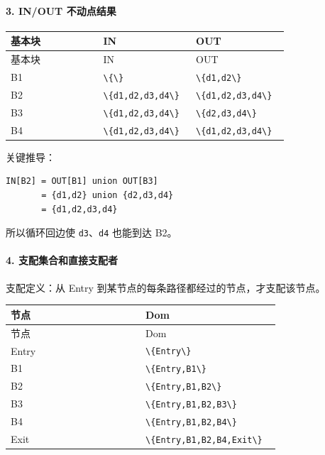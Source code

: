 \documentclass[UTF8]{ctexart}
\begin{document}
\paragraph*{3. IN/OUT 不动点结果}

\begin{longtable}{|p{0.31\linewidth}|p{0.31\linewidth}|p{0.31\linewidth}|}
\hline
基本块 & IN & OUT \\
\hline
\endfirsthead
基本块 & IN & OUT \\
\hline
\endhead
B1 & \texttt{\textbackslash{}\{\textbackslash{}\}} & \texttt{\textbackslash{}\{d1,d2\textbackslash{}\}} \\
\hline
B2 & \texttt{\textbackslash{}\{d1,d2,d3,d4\textbackslash{}\}} & \texttt{\textbackslash{}\{d1,d2,d3,d4\textbackslash{}\}} \\
\hline
B3 & \texttt{\textbackslash{}\{d1,d2,d3,d4\textbackslash{}\}} & \texttt{\textbackslash{}\{d2,d3,d4\textbackslash{}\}} \\
\hline
B4 & \texttt{\textbackslash{}\{d1,d2,d3,d4\textbackslash{}\}} & \texttt{\textbackslash{}\{d1,d2,d3,d4\textbackslash{}\}} \\
\hline
\end{longtable}

关键推导：

\begin{Verbatim}[fontsize=\small,breaklines=true]
IN[B2] = OUT[B1] union OUT[B3]
       = {d1,d2} union {d2,d3,d4}
       = {d1,d2,d3,d4}
\end{Verbatim}

所以循环回边使 \texttt{d3}、\texttt{d4} 也能到达 B2。

\paragraph*{4. 支配集合和直接支配者}

支配定义：从 Entry 到某节点的每条路径都经过的节点，才支配该节点。

\begin{longtable}{|p{0.47\linewidth}|p{0.47\linewidth}|}
\hline
节点 & Dom \\
\hline
\endfirsthead
节点 & Dom \\
\hline
\endhead
Entry & \texttt{\textbackslash{}\{Entry\textbackslash{}\}} \\
\hline
B1 & \texttt{\textbackslash{}\{Entry,B1\textbackslash{}\}} \\
\hline
B2 & \texttt{\textbackslash{}\{Entry,B1,B2\textbackslash{}\}} \\
\hline
B3 & \texttt{\textbackslash{}\{Entry,B1,B2,B3\textbackslash{}\}} \\
\hline
B4 & \texttt{\textbackslash{}\{Entry,B1,B2,B4\textbackslash{}\}} \\
\hline
Exit & \texttt{\textbackslash{}\{Entry,B1,B2,B4,Exit\textbackslash{}\}} \\
\hline
\end{longtable}
\end{document}
